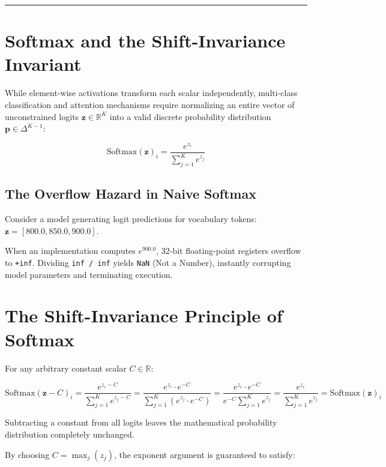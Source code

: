 \documentclass[
  letterpaper,
]{scrbook}
\begin{document}
\begin{center}\rule{0.5\linewidth}{0.5pt}\end{center}

\section{Softmax and the Shift-Invariance
Invariant}\label{softmax-and-the-shift-invariance-invariant}

While element-wise activations transform each scalar independently,
multi-class classification and attention mechanisms require normalizing
an entire vector of unconstrained logits \(\mathbf{z} \in \mathbb{R}^K\)
into a valid discrete probability distribution
\(\mathbf{p} \in \Delta^{K-1}\):

\[\text{Softmax}(\mathbf{z})_i = \frac{e^{z_i}}{\sum_{j=1}^K e^{z_j}}\]

\subsection{The Overflow Hazard in Naive
Softmax}\label{the-overflow-hazard-in-naive-softmax}

Consider a model generating logit predictions for vocabulary tokens:
\(\mathbf{z} = [800.0, 850.0, 900.0]\).

When an implementation computes \(e^{900.0}\), 32-bit floating-point
registers overflow to \texttt{+inf}. Dividing \texttt{inf\ /\ inf}
yields \texttt{NaN} (Not a Number), instantly corrupting model
parameters and terminating execution.

\section{The Shift-Invariance Principle of
Softmax}\label{the-shift-invariance-principle-of-softmax}

For any arbitrary constant scalar \(C \in \mathbb{R}\):

\[\text{Softmax}(\mathbf{z} - C)_i = \frac{e^{z_i - C}}{\sum_{j=1}^K e^{z_j - C}} = \frac{e^{z_i} \cdot e^{-C}}{\sum_{j=1}^K (e^{z_j} \cdot e^{-C})} = \frac{e^{z_i} \cdot e^{-C}}{e^{-C} \sum_{j=1}^K e^{z_j}} = \frac{e^{z_i}}{\sum_{j=1}^K e^{z_j}} = \text{Softmax}(\mathbf{z})_i\]

Subtracting a constant from all logits leaves the mathematical
probability distribution completely unchanged.

By choosing \(C = \max_j(z_j)\), the exponent argument is guaranteed to
satisfy:
\end{document}
